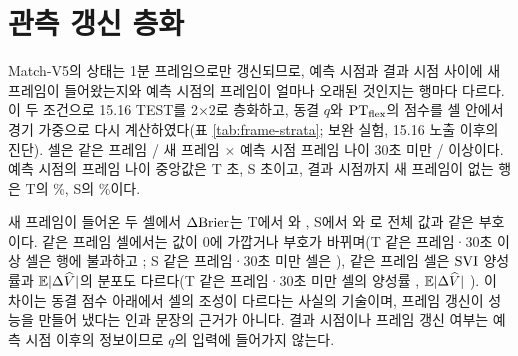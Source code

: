 \section{관측 갱신 층화}
\label{sec:val-frame}

Match-V5의 상태는 1분 프레임으로만 갱신되므로, 예측 시점과 결과 시점 사이에 새 프레임이 들어왔는지와 예측 시점의 프레임이 얼마나 오래된 것인지는 행마다 다르다. 이 두 조건으로 15.16 TEST를 2$\times$2로 층화하고, 동결 $q$와 $\mathrm{PT}_{\mathrm{flex}}$의 점수를 셀 안에서 경기 가중으로 다시 계산하였다(표 \ref{tab:frame-strata}; 보완 실험, 15.16 노출 이후의 진단). 셀은 같은 프레임 / 새 프레임 $\times$ 예측 시점 프레임 나이 30초 미만 / 이상이다. 예측 시점의 프레임 나이 중앙값은 T \fsTPreAgeMed{}초, S \fsSPreAgeMed{}초이고, 결과 시점까지 새 프레임이 없는 행은 T의 \fsTSameFrame{}\%, S의 \fsSSameFrame{}\%이다.



새 프레임이 들어온 두 셀에서 $\Delta\mathrm{Brier}$는 T에서 \fsTnyDb{}와 \fsTnoDb{}, S에서 \fsSnyDb{}와 \fsSnoDb{}로 전체 값과 같은 부호이다. 같은 프레임 셀에서는 값이 0에 가깝거나 부호가 바뀌며(T 같은 프레임·30초 이상 셀은 \fsTsoN{}행에 불과하고 \fsTsoDb{}; S 같은 프레임·30초 미만 셀은 \fsSsyDb{}), 같은 프레임 셀은 $\mathrm{SVI}$ 양성률과 $\mathbb{E}|\Delta\widehat V|$의 분포도 다르다(T 같은 프레임·30초 미만 셀의 양성률 \fsTsyPsvi{}, $\mathbb{E}|\Delta\widehat V|$ \fsTsyEdv{}). 이 차이는 동결 점수 아래에서 셀의 조성이 다르다는 사실의 기술이며, 프레임 갱신이 성능을 만들어 냈다는 인과 문장의 근거가 아니다. 결과 시점이나 프레임 갱신 여부는 예측 시점 이후의 정보이므로 $q$의 입력에 들어가지 않는다.
